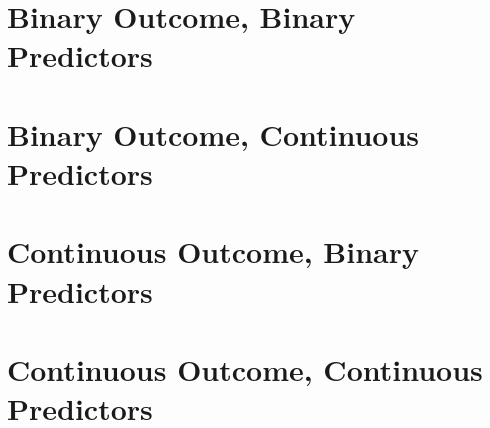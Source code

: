 
\section[Binary Y, binary X]{Binary Outcome, Binary Predictors}
 \newpage
 \newpage 
 \newpage
 \newpage

\section[Binary Y, continuous X]{Binary Outcome, Continuous Predictors}
 \newpage
 \newpage
 \newpage
 \newpage
\section[Continuous Y, binary X]{Continuous Outcome, Binary Predictors}
\section[Continuous Y, continuous X]{Continuous Outcome, Continuous Predictors}